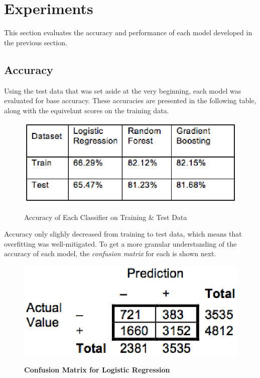 \section{Experiments}
\label{experiments}
This section evaluates the accuracy and performance of each model developed in the previous section.

\subsection{Accuracy}
\label{experiments.accuracy}
Using the test data that was set aside at the very beginning, each model was evaluated for base accuracy. These accuracies are 
presented in the following table, along with the equivelant scores on the training data.

\begin{figure} [!h]
    \centering
    \includegraphics[scale=0.5]{figs/acc.eps}
    \label{table:acc}
    \caption{Accuracy of Each Classifier on Training \& Test Data}
\end{figure}

Accuracy only slighly decreased from training to test data, which means that overfitting was well-mitigated. To get a more 
granular understanding of the accuracy of each model, the \emph{confusion matrix} for each is shown next.


\begin{figure}[!h]
    \centering
    \includegraphics[scale=0.5]{figs/lr_conf.eps}
    \label{table:lr_conf}
    \caption{\textbf{Confusion Matrix for Logistic Regression}}
\end{figure}

